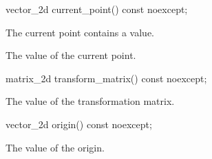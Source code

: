 \begin{itemdecl}
    vector_2d current_point() const noexcept;
\end{itemdecl}
\begin{itemdescr}
	\pnum
	\requires
	The current point contains a value.
	
	\pnum
	\returns
	The value of the current point.
\end{itemdescr}

\begin{itemdecl}
    matrix_2d transform_matrix() const noexcept;
\end{itemdecl}
\begin{itemdescr}
	\pnum
	\returns
	The value of the transformation matrix.
\end{itemdescr}

\begin{itemdecl}
    vector_2d origin() const noexcept;
\end{itemdecl}
\begin{itemdescr}
	\pnum
	\returns
	The value of the origin.
\end{itemdescr}
